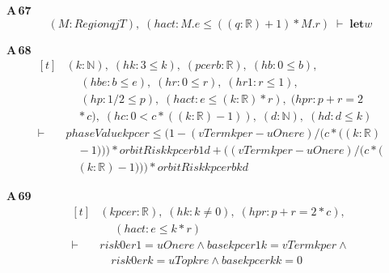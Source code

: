 \noindent\textbf{A\,67}\quad{}
{\footnotesize\[ (\mathit{M} : \mathit{Region} \mathit{q} \mathit{j} \mathit{T}),\; (\mathit{hact} : \mathit{M}.\mathit{e} \leq ((\mathit{q}:\mathbb{R} )+1)*\mathit{M}.\mathit{r}) \;\vdash\; \mathbf{let} \mathit{w} \]}

\noindent\textbf{A\,68}\quad{}
{\footnotesize\[ \begin{aligned}[t]
&(\mathit{k} : \mathbb{N} ),\; (\mathit{hk} : 3 \leq \mathit{k}),\; (\mathit{p} \mathit{c} \mathit{e} \mathit{r} \mathit{b} : \mathbb{R} ),\; (\mathit{hb} : 0 \leq \mathit{b}),\\
&\quad \; (\mathit{hbe} : \mathit{b} \leq \mathit{e}),\; (\mathit{hr} : 0 \leq \mathit{r}),\; (\mathit{hr1} : \mathit{r} \leq 1),\\
&\quad \; (\mathit{hp} : 1/2 \leq \mathit{p}),\; (\mathit{hact} : \mathit{e} \leq (\mathit{k}:\mathbb{R} )*\mathit{r}),\; (\mathit{hpr} : \mathit{p}+\mathit{r}=2\\
&\quad *\mathit{c}),\; (\mathit{hc} : 0 < \mathit{c}*((\mathit{k}:\mathbb{R} )-1)),\; (\mathit{d} : \mathbb{N} ),\; (\mathit{hd} : \mathit{d} \leq \mathit{k})\\
\vdash\;&\mathit{phaseValue} \mathit{k} \mathit{p} \mathit{c} \mathit{e} \mathit{r} \leq (1-(\mathit{vTerm} \mathit{k} \mathit{p} \mathit{e} \mathit{r}-\mathit{uOne} \mathit{r} \mathit{e})/(\mathit{c}*((\mathit{k}:\mathbb{R} )\\
&\quad -1)))*\mathit{orbitRisk} \mathit{k} \mathit{p} \mathit{c} \mathit{e} \mathit{r} \mathit{b} 1 \mathit{d}+ ((\mathit{vTerm} \mathit{k} \mathit{p} \mathit{e} \mathit{r}-\mathit{uOne} \mathit{r} \mathit{e})/(\mathit{c}*(\\
&\quad (\mathit{k}:\mathbb{R} )-1)))*\mathit{orbitRisk} \mathit{k} \mathit{p} \mathit{c} \mathit{e} \mathit{r} \mathit{b} \mathit{k} \mathit{d}
\end{aligned} \]}

\noindent\textbf{A\,69}\quad{}
{\footnotesize\[ \begin{aligned}[t]
&(\mathit{k} \mathit{p} \mathit{c} \mathit{e} \mathit{r} : \mathbb{R} ),\; (\mathit{hk} : \mathit{k} \neq 0),\; (\mathit{hpr} : \mathit{p}+\mathit{r}=2*\mathit{c}),\\
&\quad \; (\mathit{hact} : \mathit{e} \leq \mathit{k}*\mathit{r})\\
\vdash\;&\mathit{risk0} \mathit{e} \mathit{r} 1=\mathit{uOne} \mathit{r} \mathit{e} \wedge \mathit{base} \mathit{k} \mathit{p} \mathit{c} \mathit{e} \mathit{r} 1 \mathit{k}=\mathit{vTerm} \mathit{k} \mathit{p} \mathit{e} \mathit{r} \wedge\\
&\quad \mathit{risk0} \mathit{e} \mathit{r} \mathit{k}=\mathit{uTop} \mathit{k} \mathit{r} \mathit{e} \wedge \mathit{base} \mathit{k} \mathit{p} \mathit{c} \mathit{e} \mathit{r} \mathit{k} \mathit{k}=0
\end{aligned} \]}

